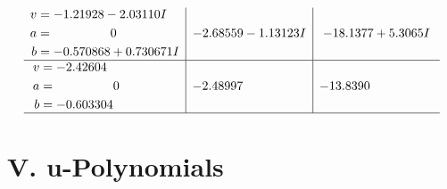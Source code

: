 \documentclass[1p]{elsarticle_modified}
\theoremstyle{definition}
\begin{document}
$$\begin{array}{c|c|c}
\begin{aligned}
v &= -1.21928 - 2.03110 I \\
a &= \phantom{-0.000000 } 0 \\
b &= -0.570868 + 0.730671 I\end{aligned}
 & -2.68559 - 1.13123 I & -18.1377 + 5.3065 I \\ \hline\begin{aligned}
v &= -2.42604\phantom{ +0.000000I} \\
a &= \phantom{-0.000000 } 0 \\
b &= -0.603304\phantom{ +0.000000I}\end{aligned}
 & -2.48997\phantom{ +0.000000I} & -13.8390\phantom{ +0.000000I}\\
 \hline 
 \end{array}$$\newpage
\newpage\renewcommand{\arraystretch}{1}
\centering \section*{ V. u-Polynomials}
\end{document}
